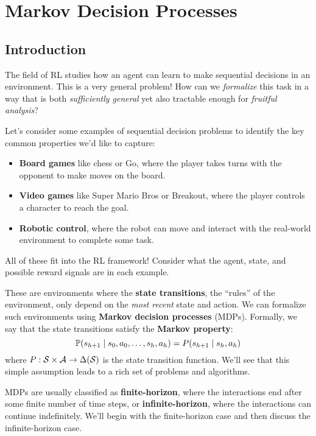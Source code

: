 \documentclass[../main/main]{subfiles}
\begin{document}
\chapter{Markov Decision Processes}

\tableofcontents

\section{Introduction}

The field of RL studies how an agent can learn to make sequential decisions in an environment. This is a very general problem! How can we \emph{formalize} this task in a way that is both \emph{sufficiently general} yet also tractable enough for \emph{fruitful analysis}?

Let's consider some examples of sequential decision problems to identify the key common properties we'd like to capture:

\begin{itemize}
    \item \textbf{Board games} like chess or Go, where the player takes turns with the opponent to make moves on the board.
    \item \textbf{Video games} like Super Mario Bros or Breakout, where the player controls a character to reach the goal.
    \item \textbf{Robotic control}, where the robot can move and interact with the real-world environment to complete some task.
\end{itemize}



All of these fit into the RL framework! Consider what the agent, state, and possible reward signals are in each example.

These are environments where the \textbf{state transitions}, the ``rules'' of the environment, only depend on the \emph{most recent} state and action. We can formalize such environments using \textbf{Markov decision processes} (MDPs). Formally, we say that the state transitions satisfy the \textbf{Markov property}:
\[
    \P(s_{h+1} \mid s_0, a_0, \dots, s_h, a_h) = P(s_{h+1} \mid s_h, a_h)
\]
where $P : \S \times \A \to \Delta(\S)$ is the state transition function. We'll see that this simple assumption leads to a rich set of problems and algorithms.

MDPs are usually classified as \textbf{finite-horizon}, where the interactions end after some finite number of time steps, or \textbf{infinite-horizon}, where the interactions can continue indefinitely. We'll begin with the finite-horizon case and then discuss the infinite-horizon case.
\end{document}
